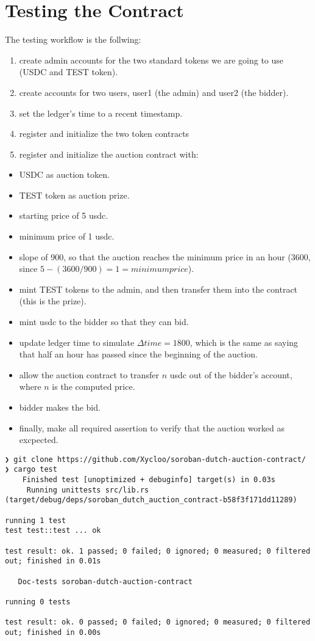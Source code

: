 \documentclass[10pt]{article}
\begin{document}
\section*{Testing the Contract}
The testing workflow is the follwing:

\begin{enumerate}
  \item create admin accounts for the two standard tokens we are going to use (USDC and TEST token).
  \item create accounts for two users, user1 (the admin) and user2 (the bidder).
  \item set the ledger's time to a recent timestamp.
  \item register and initialize the two token contracts
  \item register and initialize the auction contract with:
\end{enumerate}

\begin{itemize}
  \item USDC as auction token.
  \item TEST token as auction prize.
  \item starting price of 5 usdc.
  \item minimum price of 1 usdc.
  \item slope of 900, so that the auction reaches the minimum price in an hour (3600, since $5 - (3600/900) = 1 = minimum price$).
  \item mint TEST tokens to the admin, and then transfer them into the contract (this is the prize).
  \item mint usdc to the bidder so that they can bid.
  \item update ledger time to simulate $\Delta time = 1800$, which is the same as saying that half an hour has passed since the beginning of the auction.
  \item allow the auction contract to transfer $n$ usdc out of the bidder's account, where $n$ is the computed price.
  \item bidder makes the bid.
  \item finally, make all required assertion to verify that the auction worked as excpected.
\end{itemize}

\begin{verbatim}
❯ git clone https://github.com/Xycloo/soroban-dutch-auction-contract/
❯ cargo test
    Finished test [unoptimized + debuginfo] target(s) in 0.03s
     Running unittests src/lib.rs (target/debug/deps/soroban_dutch_auction_contract-b58f3f171dd11289)

running 1 test
test test::test ... ok

test result: ok. 1 passed; 0 failed; 0 ignored; 0 measured; 0 filtered out; finished in 0.01s

   Doc-tests soroban-dutch-auction-contract

running 0 tests

test result: ok. 0 passed; 0 failed; 0 ignored; 0 measured; 0 filtered out; finished in 0.00s

\end{verbatim}
\end{document}
